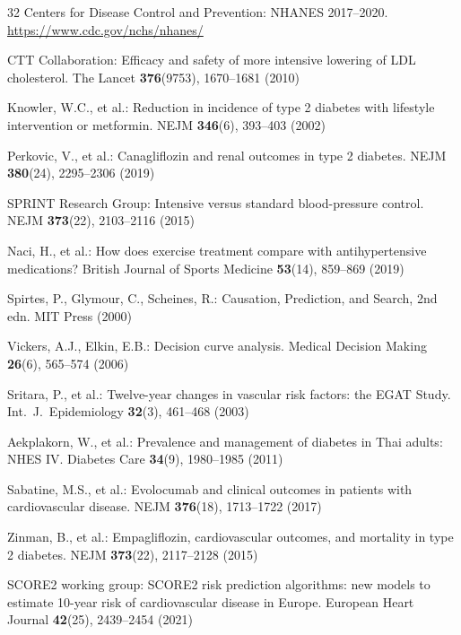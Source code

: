 \documentclass[runningheads]{llncs}
\begin{document}
\begin{thebibliography}{32}
Centers for Disease Control and Prevention:
NHANES 2017--2020.
\url{https://www.cdc.gov/nchs/nhanes/}

CTT Collaboration:
Efficacy and safety of more intensive lowering of LDL cholesterol.
The Lancet \textbf{376}(9753), 1670--1681 (2010)

Knowler, W.C., et al.:
Reduction in incidence of type 2 diabetes with lifestyle intervention or metformin.
NEJM \textbf{346}(6), 393--403 (2002)

Perkovic, V., et al.:
Canagliflozin and renal outcomes in type 2 diabetes.
NEJM \textbf{380}(24), 2295--2306 (2019)

SPRINT Research Group:
Intensive versus standard blood-pressure control.
NEJM \textbf{373}(22), 2103--2116 (2015)

Naci, H., et al.:
How does exercise treatment compare with antihypertensive medications?
British Journal of Sports Medicine \textbf{53}(14), 859--869 (2019)

Spirtes, P., Glymour, C., Scheines, R.:
Causation, Prediction, and Search, 2nd edn.
MIT Press (2000)

Vickers, A.J., Elkin, E.B.:
Decision curve analysis.
Medical Decision Making \textbf{26}(6), 565--574 (2006)

Sritara, P., et al.:
Twelve-year changes in vascular risk factors: the EGAT Study.
Int.\ J.\ Epidemiology \textbf{32}(3), 461--468 (2003)

Aekplakorn, W., et al.:
Prevalence and management of diabetes in Thai adults: NHES IV.
Diabetes Care \textbf{34}(9), 1980--1985 (2011)

Sabatine, M.S., et al.:
Evolocumab and clinical outcomes in patients with cardiovascular disease.
NEJM \textbf{376}(18), 1713--1722 (2017)

Zinman, B., et al.:
Empagliflozin, cardiovascular outcomes, and mortality in type 2 diabetes.
NEJM \textbf{373}(22), 2117--2128 (2015)

SCORE2 working group:
SCORE2 risk prediction algorithms: new models to estimate 10-year risk
of cardiovascular disease in Europe.
European Heart Journal \textbf{42}(25), 2439--2454 (2021)

\end{thebibliography}
\end{document}
